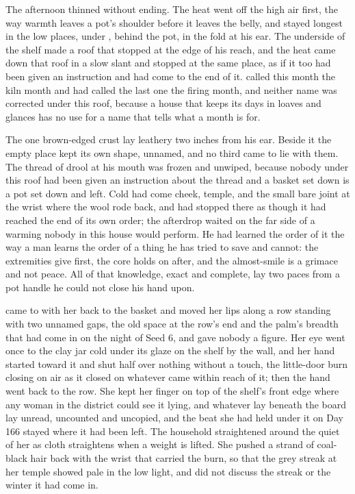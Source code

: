 The afternoon thinned without ending. The heat went off the high air first, the way warmth leaves a pot's shoulder before it leaves the belly, and stayed longest in the low places, under , behind the pot, in the fold at his ear. The underside of the shelf made a roof that stopped at the edge of his reach, and the heat came down that roof in a slow slant and stopped at the same place, as if it too had been given an instruction and had come to the end of it.  called this month the kiln month and had called the last one the firing month, and neither name was corrected under this roof, because a house that keeps its days in loaves and glances has no use for a name that tells what a month is for.

The one brown-edged crust lay leathery two inches from his ear. Beside it the empty place kept its own shape, unnamed, and no third came to lie with them. The thread of drool at his mouth was frozen and unwiped, because nobody under this roof had been given an instruction about the thread and a basket set down is a pot set down and left. Cold had come cheek, temple, and the small bare joint at the wrist where the wool rode back, and had stopped there as though it had reached the end of its own order; the afterdrop waited on the far side of a warming nobody in this house would perform. He had learned the order of it the way a man learns the order of a thing he has tried to save and cannot: the extremities give first, the core holds on after, and the almost-smile is a grimace and not peace. All of that knowledge, exact and complete, lay two paces from a pot handle he could not close his hand upon.

\scenebreak

 came to  with her back to the basket and moved her lips along a row standing with two unnamed gaps, the old space at the row's end and the palm's breadth that had come in on the night of Seed 6, and gave nobody a figure. Her eye went once to the clay jar cold under its glaze on the shelf by the wall, and her hand started toward it and shut half over nothing without a touch, the little-door burn closing on air as it closed on whatever came within reach of it; then the hand went back to the row. She kept her finger on top of the shelf's front edge where any woman in the district could see it lying, and whatever lay beneath the board lay unread, uncounted and uncopied, and the beat she had held under it on Day 166 stayed where it had been left. The household straightened around the quiet of her as cloth straightens when a weight is lifted. She pushed a strand of coal-black hair back with the wrist that carried the burn, so that the grey streak at her temple showed pale in the low light, and did not discuss the streak or the winter it had come in.

